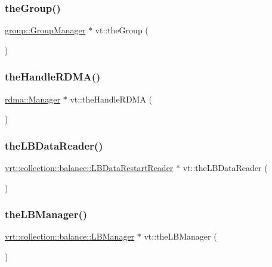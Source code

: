 \mbox{\label{namespacevt_a4548473dce44fb654400009e2b2fe64e}} 
\subsubsection{\texorpdfstring{the\+Group()}{theGroup()}}
{\footnotesize\ttfamily \hyperlink{structvt_1_1group_1_1_group_manager}{group\+::\+Group\+Manager} $\ast$ vt\+::the\+Group (\begin{DoxyParamCaption}{ }\end{DoxyParamCaption})}

\mbox{\label{namespacevt_aecb87ec2c40b5b7fc57ba4cf8ea838b0}} 
\subsubsection{\texorpdfstring{the\+Handle\+R\+D\+M\+A()}{theHandleRDMA()}}
{\footnotesize\ttfamily \hyperlink{structvt_1_1rdma_1_1_manager}{rdma\+::\+Manager} $\ast$ vt\+::the\+Handle\+R\+D\+MA (\begin{DoxyParamCaption}{ }\end{DoxyParamCaption})}

\mbox{\label{namespacevt_a6dc000b04e41df77184588b50280b312}} 
\subsubsection{\texorpdfstring{the\+L\+B\+Data\+Reader()}{theLBDataReader()}}
{\footnotesize\ttfamily \hyperlink{structvt_1_1vrt_1_1collection_1_1balance_1_1_l_b_data_restart_reader}{vrt\+::collection\+::balance\+::\+L\+B\+Data\+Restart\+Reader} $\ast$ vt\+::the\+L\+B\+Data\+Reader (\begin{DoxyParamCaption}{ }\end{DoxyParamCaption})}

\mbox{\label{namespacevt_a05187076eac8c66c9951b062b0955520}} 
\subsubsection{\texorpdfstring{the\+L\+B\+Manager()}{theLBManager()}}
{\footnotesize\ttfamily \hyperlink{structvt_1_1vrt_1_1collection_1_1balance_1_1_l_b_manager}{vrt\+::collection\+::balance\+::\+L\+B\+Manager} $\ast$ vt\+::the\+L\+B\+Manager (\begin{DoxyParamCaption}{ }\end{DoxyParamCaption})}

